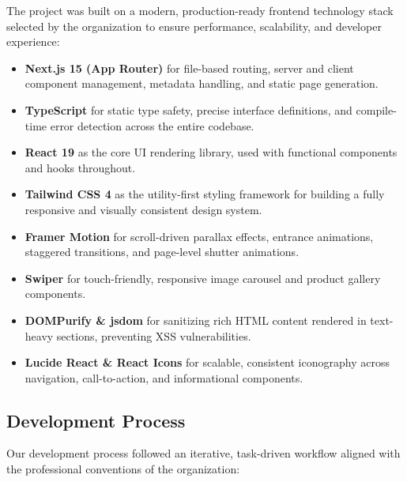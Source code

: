 \documentclass[12pt, oneside, a4paper]{book}
\begin{document}
\begin{doublespace}
The project was built on a modern, production-ready frontend technology stack selected
by the organization to ensure performance, scalability, and developer experience:

\begin{itemize}
  \item \textbf{Next.js 15 (App Router)} for file-based routing, server and client
  component management, metadata handling, and static page generation.
  \item \textbf{TypeScript} for static type safety, precise interface definitions, and
  compile-time error detection across the entire codebase.
  \item \textbf{React 19} as the core UI rendering library, used with functional
  components and hooks throughout.
  \item \textbf{Tailwind CSS 4} as the utility-first styling framework for building
  a fully responsive and visually consistent design system.
  \item \textbf{Framer Motion} for scroll-driven parallax effects, entrance animations,
  staggered transitions, and page-level shutter animations.
  \item \textbf{Swiper} for touch-friendly, responsive image carousel and product
  gallery components.
  \item \textbf{DOMPurify \& jsdom} for sanitizing rich HTML content rendered in
  text-heavy sections, preventing XSS vulnerabilities.
  \item \textbf{Lucide React \& React Icons} for scalable, consistent iconography
  across navigation, call-to-action, and informational components.
\end{itemize}

\subsection{Development Process}

Our development process followed an iterative, task-driven workflow aligned with the
professional conventions of the organization:


\end{doublespace}
\end{document}
